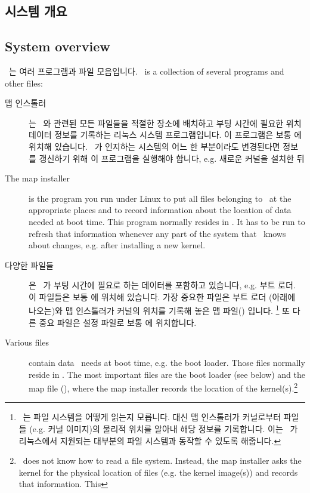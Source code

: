 \newpage
\subsection*{시스템 개요}
\subsection*{System overview}

\LILO\ 는 여러 프로그램과 파일 모음입니다.
\LILO\ is a collection of several programs and other files:

\begin{description}
  \item[맵 인스톨러] 는 \LILO\ 와 관련된 모든 파일들을 적절한 장소에 배치하고 부팅 시간에 필요한 위치 데이터 정보를 기록하는 리눅스 시스템 프로그램입니다. 이 프로그램은 보통  에 위치해 있습니다. \LILO\ 가 인지하는 시스템의 어느 한 부분이라도 변경된다면 정보를 갱신하기 위해 이 프로그램을 실행해야 합니다, e.g. 새로운 커널을 설치한 뒤 
  \item[The map installer] is the program you run under Linux to put all
    files belonging to \LILO\ at the appropriate places and to record
    information about the location of data needed at boot time. This program
    normally resides in . It has to be run to refresh that
    information whenever any part of the system that \LILO\ knows about
    changes, e.g. after installing a new kernel.
  \item[다양한 파일들] 은 \LILO\ 가 부팅 시간에 필요로 하는 데이터를 포함하고 있습니다, e.g. 부트 로더. 이 파일들은 보통  에 위치해 있습니다. 가장 중요한 파일은 부트 로더 (아래에 나오는)와 맵 인스톨러가 커널의 위치를 기록해 놓은 맵 파일() 입니다. \footnote{\LILO\ 는 파일 시스템을 어떻게 읽는지 모릅니다. 대신 맵 인스톨러가 커널로부터 파일들 (e.g. 커널 이미지)의 물리적 위치를 알아내 해당 정보를 기록합니다. 이는 \LILO\ 가 리눅스에서 지원되는 대부분의 파일 시스템과 동작할 수 있도록 해줍니다.} 또 다른 중요 파일은 설정 파일로 보통  에 위치합니다.
  \item[Various files] contain data \LILO\ needs at boot time, e.g. the
    boot loader. Those files normally reside in . The most
    important files are the boot loader (see below) and the map file
    (), where the map installer records the location of
    the kernel(s).\footnote{\LILO\ does not know how to read a file system.
    Instead, the map installer asks the kernel for the physical location of
    files (e.g. the kernel image(s)) and records that information. This
}
\end{description}
